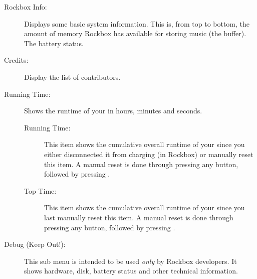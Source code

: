 \begin{description}
\item[Rockbox Info:]
  Displays some basic system information. This is, from top to bottom,
  the amount of memory Rockbox has available for storing music (the buffer).
  The battery status.
%

\item[Credits:]
  Display the list of contributors.

\item[Running Time:]
  Shows the runtime of your \dap{} in hours, minutes and seconds.
  \begin{description}
    \item[Running Time:]
        This item shows the cumulative overall runtime of your \dap{} since you 
        either disconnected it from charging (in Rockbox) or manually 
        reset this item. A manual reset is done through pressing any button, 
        followed by pressing \ActionStdOk{}.
    \item[Top Time:]
        This item shows the cumulative overall runtime of your \dap{} since you 
        last manually reset this item. A manual reset is done through pressing 
        any button, followed by pressing \ActionStdOk{}.
  \end{description}

\item[Debug (Keep Out!):]
  This sub menu is intended to be used \emph{only} by Rockbox developers.
  It shows hardware, disk, battery status and other technical information.  
\end{description}


